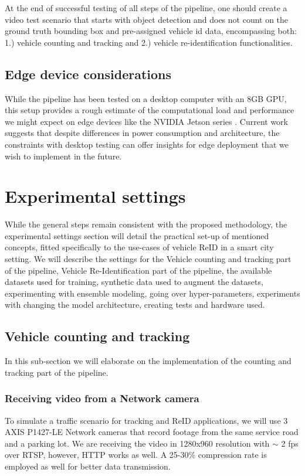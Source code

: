 \documentclass[conference]{IEEEtran} %
\begin{document}
		At the end of successful testing of all steps of the pipeline, one should create a video test scenario that starts with object detection and does not count on the ground truth bounding box and pre-assigned vehicle id data, encompassing both: 1.) vehicle counting and tracking and 2.) vehicle re-identification functionalities.
		
		
		
		\subsection{Edge device considerations}
		
		While the pipeline has been tested on a desktop computer with an 8GB GPU, this setup provides a rough estimate of the computational load and performance we might expect on edge devices like the NVIDIA Jetson series \cite{valladares2021performance}. Current work suggests that despite differences in power consumption and architecture, the constraints with desktop testing can offer insights for edge deployment that we wish to implement in the future.

	
	\section{Experimental settings}
		
		While the general steps remain consistent with the proposed methodology, the experimental settings section will detail the practical set-up of mentioned concepts, fitted specifically to the use-cases of vehicle ReID in a smart city setting. We will describe the settings for the Vehicle counting and tracking part of the pipeline, Vehicle Re-Identification part of the pipeline, the available datasets used for training, synthetic data used to augment the datasets, experimenting with ensemble modeling, going over hyper-parameters, experiments with changing the model architecture, creating tests and hardware used.
		
		\subsection{Vehicle counting and tracking}
			In this sub-section we will elaborate on the implementation of the counting and tracking part of the pipeline.
			\subsubsection{Receiving video from a Network camera}
				To simulate a traffic scenario for tracking and ReID applications, we will use 3 AXIS P1427-LE Network cameras \cite{axisCam} that record footage from the same service road and a parking lot.
				We are receiving the video in 1280x960 resolution with $\sim$ 2 fps over RTSP, however, HTTP works as well. A 25-30\% compression rate is employed as well for better data transmission.
				
\end{document}
